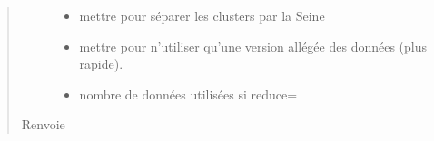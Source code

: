 \documentclass[letterpaper,10pt,french]{sphinxmanual}
\begin{document}
\begin{fulllineitems}
\begin{quote}
\begin{description}
\begin{itemize}
\item {} 
\sphinxAtStartPar
{} \textendash{} mettre  pour séparer les clusters par la Seine

\item {} 
\sphinxAtStartPar
{} \textendash{} mettre  pour n’utiliser qu’une version allégée des données (plus rapide).

\item {} 
\sphinxAtStartPar
{} \textendash{} nombre de données utilisées si reduce= 

\end{itemize}

\item[{Renvoie}] \leavevmode
\sphinxAtStartPar
{}

\end{description}\end{quote}

\end{fulllineitems}

\end{document}
